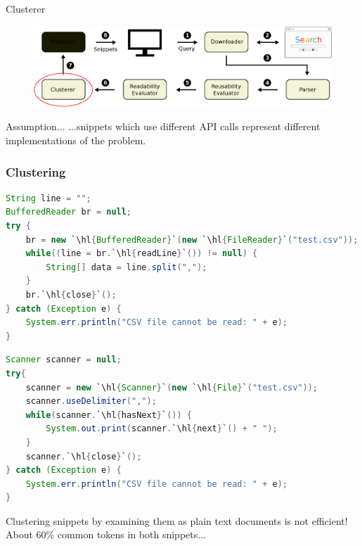 \documentclass[compress]{beamer}
\newcommand\hl[1]{\setlength{\fboxsep}{1.5pt}\colorbox{hlpurple}{#1}}
\begin{document}
\begin{frame}{Clusterer}

\begin{figure}[t]
\includegraphics[scale=0.35]{clusterer}
\end{figure}


\begin{exampleblock}{Assumption...}
...snippets which use different API calls represent different implementations of the problem.
\end{exampleblock}

\end{frame}


\begin{frame}[fragile]
\frametitle{Clustering}

\begin{lstlisting}[language=Java,basicstyle=\tiny]
String line = "";
BufferedReader br = null;
try {
    br = new `\hl{BufferedReader}`(new `\hl{FileReader}`("test.csv"));
    while((line = br.`\hl{readLine}`()) != null) {
        String[] data = line.split(",");
    }
    br.`\hl{close}`();
} catch (Exception e) {
    System.err.println("CSV file cannot be read: " + e);
}
\end{lstlisting}

\begin{lstlisting}[language=Java,basicstyle=\tiny]
Scanner scanner = null;
try{
    scanner = new `\hl{Scanner}`(new `\hl{File}`("test.csv"));
    scanner.useDelimiter(",");
    while(scanner.`\hl{hasNext}`()) {
        System.out.print(scanner.`\hl{next}`() + " ");
    }
    scanner.`\hl{close}`();
} catch (Exception e) {
    System.err.println("CSV file cannot be read: " + e);
}
\end{lstlisting}

Clustering snippets by examining them as plain text documents is \alert{not efficient}! About 60\% common tokens in both snippets...

\end{frame}
\end{document}

